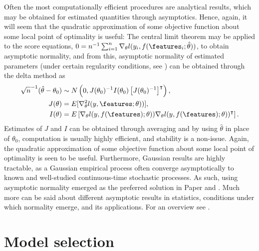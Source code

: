 Often the most computationally efficient procedures are analytical results, which may be obtained for estimated quantities through asymptotics.
Hence, again, it will seem that the quadratic approximation of some objective function about some local point of optimality is useful:
The central limit theorem may be applied to the score equations, $0=n^{-1}\sum_{i=1}^{n}\nabla_\theta l(y_i,f(\features_i;\hat{\theta}))$, to obtain asymptotic normality, and from this, asymptotic normality of estimated parameters (under certain regularity conditions, see \citet{vanDerVaart}) can be obtained through the delta method as 
\begin{align}\label{eq:parameters-asymptotic-normality}
	\sqrt{n}^{-1}(\hat{\theta}-\theta_0) &\sim N\left( 0, J(\theta_0)^{-1}I(\theta_0)\left[J(\theta_0)^{-1}\right]^\intercal \right),\\
	J(\theta) &= E[\nabla_\theta^2 l(y,\features;\theta))],\notag\\
	I(\theta) &= E\left[ \nabla_\theta l(y,f(\features);\theta))\nabla_\theta l(y,f(\features);\theta))^\intercal \right].\notag
\end{align}
Estimates of $J$ and $I$ can be obtained through averaging and by using $\hat\theta$ in place of $\theta_0$, computation is usually highly efficient, and stability is a non-issue.
Again, the quadratic approximation of some objective function about some local point of optimality is seen to be useful.
Furthermore, Gaussian results are highly tractable, as a Gaussian empirical process often converge asymptotically to known and well-studied continuous-time stochastic processes.
As such, using asymptotic normality emerged as the preferred solution in Paper  and .
Much more can be said about different asymptotic results in statistics, conditions under which normality emerge, and its applications. For an overview see \citet{vanDerVaart}.


\section{Model selection}
\label{sec:model selection}


